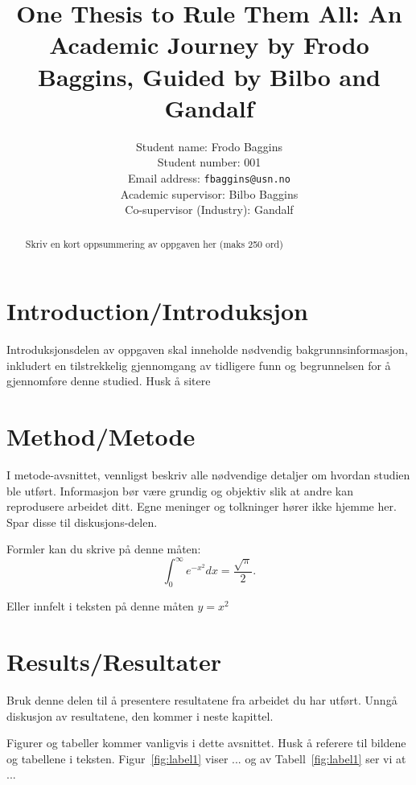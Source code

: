 \documentclass[a4paper, 10pt]{article}
\title{One Thesis to Rule Them All: An Academic Journey by Frodo Baggins, Guided by Bilbo and Gandalf  \\ [3ex] %

}  %
\author{
  Student name: Frodo Baggins \\ [2ex]
  Student number: 001 \\ [2ex] 
  Email address: \texttt{fbaggins@usn.no} \\ [2ex]
  Academic supervisor: Bilbo Baggins \\ [1ex]
  Co-supervisor (Industry): Gandalf\\ [10ex]
}
\begin{document}
\maketitle
\thispagestyle{empty}
\newpage

\begin{abstract}
Skriv en kort oppsummering av oppgaven her (maks 250 ord)
\end{abstract}

\section{Introduction/Introduksjon}

Introduksjonsdelen av oppgaven skal inneholde nødvendig bakgrunnsinformasjon, inkludert en tilstrekkelig gjennomgang av tidligere funn og begrunnelsen for å gjennomføre denne studied. Husk å sitere~\cite{attention_is_all_you_need}

\section{Method/Metode}
I metode-avsnittet, vennligst beskriv alle nødvendige
detaljer om hvordan studien ble utført. Informasjon bør være grundig og objektiv slik at andre kan reprodusere arbeidet ditt.
Egne meninger og tolkninger hører ikke hjemme her. Spar disse til diskusjons-delen.

Formler kan du skrive på denne måten: \begin{equation}
\int_0^\infty e^{-x^2}dx = \frac{\sqrt{\pi}}{2}.
\label{eq:label}
\end{equation}

Eller innfelt i teksten på denne måten $y = x^2$

\section{Results/Resultater}
Bruk denne delen til å presentere resultatene fra arbeidet du har utført. Unngå diskusjon av resultatene, den kommer i neste kapittel.

Figurer og tabeller kommer vanligvis i dette avsnittet. Husk å referere til bildene og tabellene i teksten. Figur~\ref{fig:label1} viser ...
og av Tabell~\ref{fig:label1} ser vi at ...
\end{document}

